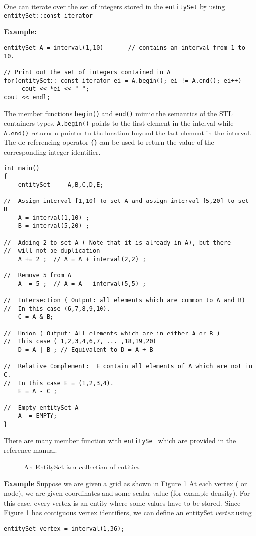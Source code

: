 One can iterate over the set of integers stored in the {\tt entitySet} by 
using {\tt entitySet::const\_iterator}

{\bf Example:~ }

\begin{verbatim}
entitySet A = interval(1,10)       // contains an interval from 1 to 10.

// Print out the set of integers contained in A
for(entitySet:: const_iterator ei = A.begin(); ei != A.end(); ei++)
     cout << *ei << " ";
cout << endl;
\end{verbatim}

The member functions {\tt begin()} and {\tt end()} mimic the semantics
of the STL containers types. {\tt A.begin()} points to the first
element in the interval while {\tt A.end()} returns a pointer to the
location beyond the last element in the interval. The de-referencing
operator {\bf *()} can be used to return the value of the
corresponding integer identifier.

\begin{verbatim}
int main()
{
    entitySet     A,B,C,D,E;

//  Assign interval [1,10] to set A and assign interval [5,20] to set B
    A = interval(1,10) ;
    B = interval(5,20) ;

//  Adding 2 to set A ( Note that it is already in A), but there
//  will not be duplication    
    A += 2 ;  // A = A + interval(2,2) ;

//  Remove 5 from A
    A -= 5 ;  // A = A - interval(5,5) ;

//  Intersection ( Output: all elements which are common to A and B)
//  In this case (6,7,8,9,10).
    C = A & B;

//  Union ( Output: All elements which are in either A or B )
//  This case ( 1,2,3,4,6,7, ... ,18,19,20)
    D = A | B ; // Equivalent to D = A + B

//  Relative Complement:  E contain all elements of A which are not in C.
//  In this case E = (1,2,3,4).
    E = A - C ;

//  Empty entitySet A
    A  = EMPTY;
}
\end{verbatim}

There are many member function with {\tt entitySet} which are provided in the
reference manual.

%
\begin{figure}[ht]
\vspace{3.5in}\caption { An EntitySet is a collection of entities}
\label {FigEntitySet}
\end{figure}
%
\par{\bf Example} Suppose we are given a grid as shown in Figure \ref{FigEntitySet}
At each vertex ( or node), we are given coordinates and some scalar value
(for example density). For this case, every vertex is an entity where
some values have to be stored. 
%
Since Figure \ref{FigEntitySet} has contiguous vertex identifiers, we can define an
entitySet {\em vertex} using 
\begin{verbatim}
entitySet vertex = interval(1,36);
\end{verbatim}

